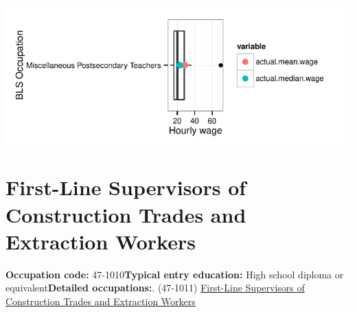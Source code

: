 \documentclass[a4paper,10pt]{article}\usepackage[]{graphicx}\usepackage[]{color}
\makeatletter
\def\maxwidth{ %
  \ifdim\Gin@nat@width>\linewidth
    \linewidth
  \else
    \Gin@nat@width
  \fi
}
\makeatother
\begin{document}
{\centering \includegraphics[width=\maxwidth]{figure/unnamed-chunk-273} 

}


\newpage\section{First-Line Supervisors of Construction Trades and Extraction Workers}\textbf{Occupation code:} 47-1010\newline\textbf{Typical entry education:} High school diploma or equivalent\newline\textbf{Detailed occupations:}. (47-1011)  \href{http://www.bls.gov/oes/current/oes471011.htm}{First-Line Supervisors of Construction Trades and Extraction Workers}\newline%
\end{document}
